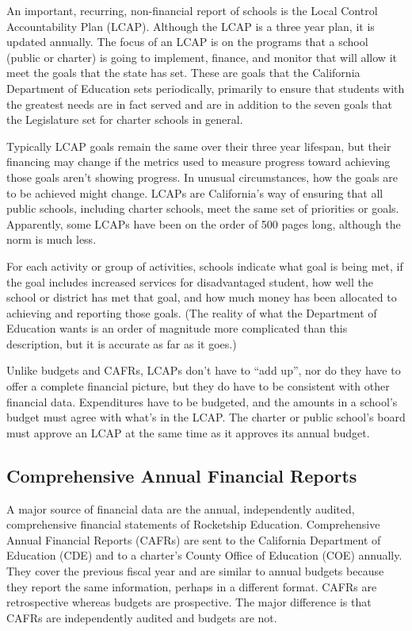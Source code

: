 An important, recurring, non-financial report of schools is the Local Control Accountability Plan (LCAP). Although the LCAP is a three year plan, it is updated annually. The focus of an LCAP is on the programs that a school (public or charter) is going to implement, finance, and monitor that will allow it meet the goals that the state has set. These are goals that the California Department of Education sets periodically, primarily to ensure that students with the greatest needs are in fact served and are in addition to the seven goals that the Legislature set for charter schools in general.

Typically LCAP goals remain the same over their three year lifespan, but their financing may change if the metrics used to measure progress toward achieving those goals aren't showing progress. In unusual circumstances, how the goals are to be achieved might change. LCAPs are California's way of ensuring that all public schools, including charter schools, meet the same set of priorities or goals. Apparently, some LCAPs have been on the order of 500 pages long, although the norm is much less.

For each activity or group of activities, schools indicate what goal is being met, if the goal includes increased services for disadvantaged student, how well the school or district has met that goal, and how much money has been allocated to achieving and reporting those goals. (The reality of what the Department of Education wants is an order of magnitude more complicated than this description, but it is accurate as far as it goes.)

Unlike budgets and CAFRs, LCAPs don't have to ``add up'', nor do they have to offer a complete financial picture, but they do have to be consistent with other financial data. Expenditures have to be budgeted, and the amounts in a school's budget must agree with what's in the LCAP\@. The charter or public school's board must approve an LCAP at the same time as it approves its annual budget. %

\subsection{Comprehensive Annual Financial Reports}\label{sec:CAFRs}\indent

A major source of financial data are the annual, independently audited, comprehensive financial statements of Rocketship Education. Comprehensive Annual Financial Reports (CAFRs) are sent to the California Department of Education (CDE) and to a charter's County Office of Education (COE) annually. They cover the previous fiscal year and are similar to annual budgets because they report the same information, perhaps in a different format. CAFRs are retrospective whereas budgets are prospective. The major difference is that CAFRs are independently audited and budgets are not. 

